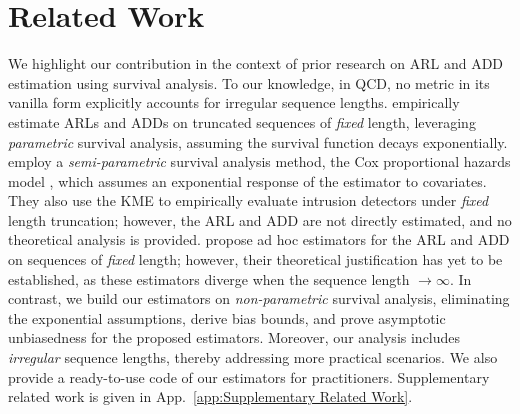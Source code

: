 \documentclass{article}
\theoremstyle{plain}
\theoremstyle{definition}
\theoremstyle{remark}
\begin{document}
\section{Related Work} \label{sec:Related Work}
We highlight our contribution in the context of prior research on ARL and ADD estimation using survival analysis. 
To our knowledge, in QCD, no metric in its vanilla form explicitly accounts for irregular sequence lengths.
\citet{sahki2020performance} empirically estimate ARLs and ADDs on truncated sequences of \textit{fixed} length, leveraging \textit{parametric} survival analysis, assuming the survival function decays exponentially.
\citet{bradley2023novelty} employ a \textit{semi-parametric} survival analysis method, the Cox proportional hazards model \citep{cox1972regression}, which assumes an exponential response of the estimator to covariates.
They also use the KME to empirically evaluate intrusion detectors under \textit{fixed} length truncation; however, the ARL and ADD are not directly estimated, and no theoretical analysis is provided.
\citet{lim2025efficient} propose ad hoc estimators for the ARL and ADD on sequences of \textit{fixed} length; however, their theoretical justification has yet to be established, as these estimators diverge when the sequence length $\rightarrow \infty$.
In contrast, we build our estimators on \textit{non-parametric} survival analysis, eliminating the exponential assumptions, derive bias bounds, and prove asymptotic unbiasedness for the proposed estimators. 
Moreover, our analysis includes \textit{irregular} sequence lengths, thereby addressing more practical scenarios.
We also provide a ready-to-use code of our estimators for practitioners.
Supplementary related work is given in App.~\ref{app:Supplementary Related Work}.
\end{document}
